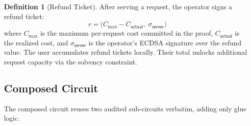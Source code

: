 \documentclass[11pt,a4paper]{article}
\theoremstyle{definition}
\newtheorem{definition}{Definition}
\begin{document}
\begin{definition}[Refund Ticket]
After serving a request, the operator signs a refund ticket:
$$r = \big(C_{\max} - C_{\mathsf{actual}},\; \sigma_{\mathsf{server}}\big)$$
where $C_{\max}$ is the maximum per-request cost committed in the proof, $C_{\mathsf{actual}}$ is the realized cost, and $\sigma_{\mathsf{server}}$ is the operator's ECDSA signature over the refund value. The user accumulates refund tickets locally. Their total unlocks additional request capacity via the solvency constraint.
\end{definition}

\subsection{Composed Circuit}

The composed circuit reuses two audited sub-circuits verbatim, adding only glue logic.
\end{document}
